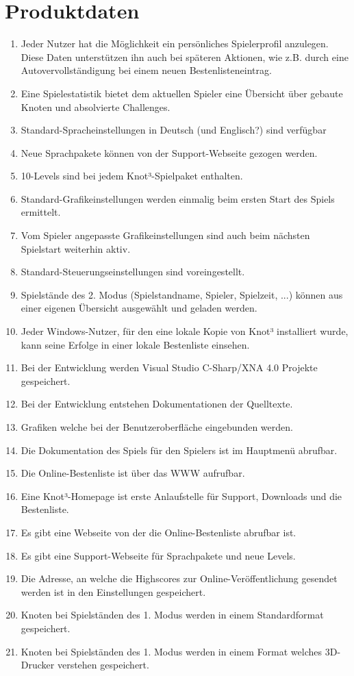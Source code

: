 \chapter{Produktdaten}

\renewcommand{\theenumi}{/PD\_\arabic{enumi}0/}
\renewcommand{\labelenumi}{\theenumi}

\begin{enumerate}

\item Jeder Nutzer hat die Möglichkeit ein persönliches Spielerprofil anzulegen. Diese Daten unterstützen ihn auch bei späteren Aktionen, wie z.B. durch eine Autovervollständigung bei einem neuen Bestenlisteneintrag. 
\item Eine Spielestatistik bietet dem aktuellen Spieler eine Übersicht über gebaute Knoten und absolvierte Challenges.
\item Standard-Spracheinstellungen in Deutsch (und Englisch?) sind verfügbar
\item Neue Sprachpakete können von der Support-Webseite gezogen werden.
\item 10-Levels sind bei jedem Knot³-Spielpaket enthalten.
\item Standard-Grafikeinstellungen werden einmalig beim ersten Start des Spiels ermittelt.
\item Vom Spieler angepasste Grafikeinstellungen sind auch beim nächsten Spielstart weiterhin aktiv.
\item Standard-Steuerungseinstellungen sind voreingestellt.
\item Spielstände des 2. Modus (Spielstandname, Spieler, Spielzeit, ...) können aus einer eigenen Übersicht ausgewählt und geladen werden.
\item Jeder Windows-Nutzer, für den eine lokale Kopie von Knot³ installiert wurde, kann seine Erfolge in einer lokale Bestenliste einsehen.
\item Bei der Entwicklung werden Visual Studio C-Sharp/XNA 4.0 Projekte gespeichert.
\item Bei der Entwicklung entstehen Dokumentationen der Quelltexte.
\item Grafiken welche bei der Benutzeroberfläche eingebunden werden.
\item Die Dokumentation des Spiels für den Spielers ist im Hauptmenü abrufbar.
\item Die Online-Bestenliste ist über das WWW aufrufbar.
\item Eine Knot³-Homepage ist erste Anlaufstelle für Support, Downloads und die Bestenliste.
\item Es gibt eine Webseite von der die Online-Bestenliste abrufbar ist.
\item Es gibt eine Support-Webseite für Sprachpakete und neue Levels.
\item Die Adresse, an welche die Highscores zur Online-Veröffentlichung gesendet werden ist in den Einstellungen gespeichert.
\item Knoten bei Spielständen des 1. Modus werden in einem Standardformat gespeichert.
\item Knoten bei Spielständen des 1. Modus werden in einem Format welches 3D-Drucker verstehen gespeichert.


\end{enumerate}



